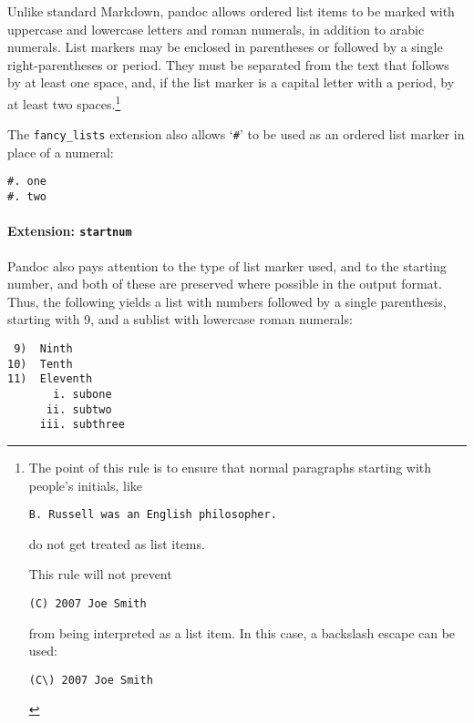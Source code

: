 \documentclass[]{article}
\let\oldparagraph\paragraph
\renewcommand{\paragraph}[1]{\oldparagraph{#1}\mbox{}}
\begin{document}
Unlike standard Markdown, pandoc allows ordered list items to be marked
with uppercase and lowercase letters and roman numerals, in addition to
arabic numerals. List markers may be enclosed in parentheses or followed
by a single right-parentheses or period. They must be separated from the
text that follows by at least one space, and, if the list marker is a
capital letter with a period, by at least two spaces.\footnote{The point
  of this rule is to ensure that normal paragraphs starting with
  people's initials, like

\begin{Verbatim}
B. Russell was an English philosopher.
\end{Verbatim}

  do not get treated as list items.

  This rule will not prevent

\begin{Verbatim}
(C) 2007 Joe Smith
\end{Verbatim}

  from being interpreted as a list item. In this case, a backslash
  escape can be used:

\begin{Verbatim}
(C\) 2007 Joe Smith
\end{Verbatim}
}

The \texttt{fancy\_lists} extension also allows `\texttt{\#}' to be used
as an ordered list marker in place of a numeral:

\begin{verbatim}
#. one
#. two
\end{verbatim}

\paragraph{\texorpdfstring{Extension:
\texttt{startnum}}{Extension: startnum}}\label{extension-startnum}

Pandoc also pays attention to the type of list marker used, and to the
starting number, and both of these are preserved where possible in the
output format. Thus, the following yields a list with numbers followed
by a single parenthesis, starting with 9, and a sublist with lowercase
roman numerals:

\begin{verbatim}
 9)  Ninth
10)  Tenth
11)  Eleventh
       i. subone
      ii. subtwo
     iii. subthree
\end{verbatim}
\end{document}
